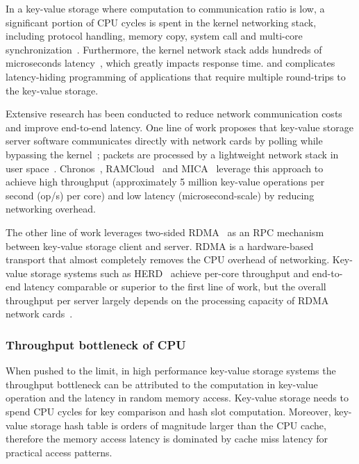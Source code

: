 {In a key-value storage where computation to communication ratio is low, a significant portion of CPU cycles is spent in the kernel networking stack, including protocol handling, memory copy, system call and multi-core synchronization~\cite{peter2016arrakis}.
Furthermore, the kernel network stack adds hundreds of microseconds latency~\cite{ousterhout2015ramcloud}, which greatly impacts response time.
and complicates latency-hiding programming of applications that require multiple round-trips to the key-value storage.

Extensive research has been conducted to reduce network communication costs and improve end-to-end latency. One line of work proposes that key-value storage server software communicates directly with network cards by polling while bypassing the kernel~\cite{rizzo2012netmap, intel2014data}; packets are processed by a lightweight network stack in user space~\cite{jeong2014mtcp, marinos2014network}. Chronos~\cite{kapoor2012chronos}, RAMCloud~\cite{ousterhout2010case, ousterhout2015ramcloud} and MICA~\cite{lim2014mica,li2016full} leverage this approach to achieve high throughput (approximately 5 million key-value operations per second (op/s) per core) and low latency (microsecond-scale) by reducing networking overhead.

The other line of work leverages two-sided RDMA~\cite{infiniband2000infiniband} as an RPC mechanism between key-value storage client and server. RDMA is a hardware-based transport that almost completely removes the CPU overhead of networking. Key-value storage systems such as HERD~\cite{kalia2014using, kalia2016design} achieve per-core throughput and end-to-end latency comparable or superior to the first line of work, but the overall throughput per server largely depends on the processing capacity of RDMA network cards~\cite{kalia2016design}.

\subsubsection{Throughput bottleneck of CPU}
\label{kvdirect:sec:CPU-键值-Bottleneck}
When pushed to the limit, in high performance key-value storage systems the throughput bottleneck can be attributed to the computation in key-value operation and the latency in random memory access. Key-value storage needs to spend CPU cycles for key comparison and hash slot computation. Moreover, key-value storage hash table is orders of magnitude larger than the CPU cache, therefore the memory access latency is dominated by cache miss latency for practical access patterns.

}
